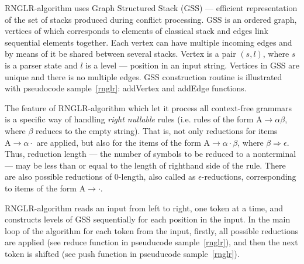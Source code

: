 \documentclass{llncs}
\begin{document}
RNGLR-algorithm uses Graph Structured Stack (GSS) — efficient representation of 
the set of stacks produced during conflict processing. GSS is an ordered graph, 
vertices of which corresponds to elements of classical stack and edges link sequential 
elements together. Each vertex can have multiple incoming edges and by means of 
it be shared between several stacks. Vertex is a pair $(s, l)$, where $s$ is a 
parser state and $l$ is a level — position in an input string. Vertices in GSS 
are unique and there is no multiple edges. GSS construction routine is illustrated 
with pseudocode sample~\ref{rnglr}: addVertex and addEdge functions. 

The feature of RNGLR-algorithm which let it process all context-free grammars is
a specific way of handling \textit{right nullable} rules (i.e. rules of the form 
$\mathrm{A} \rightarrow \alpha \beta$, where $\beta$ reduces to the empty string). 
That is, not only reductions for items $\mathrm{A} \rightarrow \alpha \cdot$ are 
applied, but also for the items of the form  $\mathrm{A} \rightarrow \alpha \cdot 
\beta$, where $\beta \Rightarrow \epsilon$. Thus, reduction length — the number of 
symbols to be reduced to a nonterminal — may be less than or equal to the length 
of righthand side of the rule. There are also possible reductions of 0-length, 
also called as $\epsilon$-reductions, corresponding to items of the form $\mathrm{A} 
\rightarrow \cdot$. 

RNGLR-algorithm reads an input from left to right, one token at a time, and 
constructs levels of GSS sequentially for each position in the input. In the 
main loop of the algorithm for each token from the input, firstly, all possible 
reductions are applied (see reduce function in pseuducode sample~\ref{rnglr}), and then the next  token 
is shifted (see push function in pseuducode sample~\ref{rnglr}).
\end{document}
